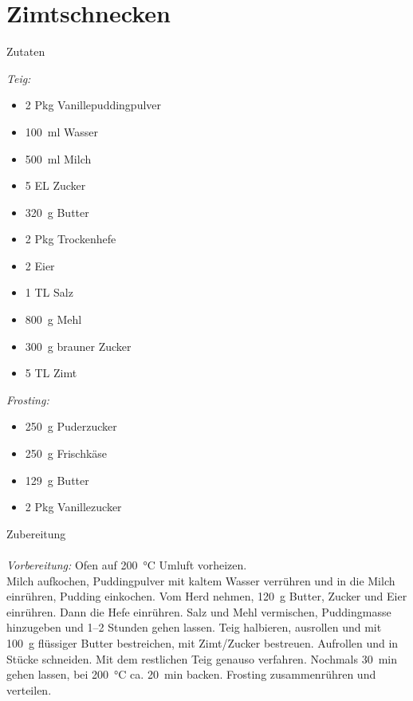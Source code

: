 \section*{Zimtschnecken}
\ihead{}\ohead{}
\cfoot{}
{\Large Zutaten}
\begin{multicols}{2}
\textit{Teig:}
\begin{itemize}
    \item \num{2} Pkg Vanillepuddingpulver
    \item \SI{100}{ml} Wasser
    \item \SI{500}{ml} Milch
    \item \num{5} EL Zucker
    \item \SI{320}{g} Butter
    \item \num{2} Pkg Trockenhefe
    \item \num{2} Eier
    \item \num{1} TL Salz
    \item \SI{800}{g} Mehl
    \item \SI{300}{g} brauner Zucker
    \item \num{5} TL Zimt
\end{itemize}
\textit{Frosting:}
\begin{itemize}
    \item \SI{250}{g} Puderzucker
    \item \SI{250}{g} Frischkäse
    \item \SI{129}{g} Butter
    \item \num{2} Pkg Vanillezucker
\end{itemize}
\end{multicols}
\noindent
{\Large Zubereitung}\\
\\
\textit{Vorbereitung:} Ofen auf \SI{200}{\celsius} Umluft vorheizen.\\
Milch aufkochen, Puddingpulver mit kaltem Wasser verrühren und in die Milch einrühren, Pudding einkochen.
Vom Herd nehmen, \SI{120}{g} Butter, Zucker und Eier einrühren.
Dann die Hefe einrühren. 
Salz und Mehl vermischen, Puddingmasse hinzugeben und \numrange{1}{2} Stunden gehen lassen.
Teig halbieren, ausrollen und mit \SI{100}{g} flüssiger Butter bestreichen, mit Zimt/Zucker bestreuen. 
Aufrollen und in Stücke schneiden.
Mit dem restlichen Teig genauso verfahren. 
Nochmals \SI{30}{min} gehen lassen, bei \SI{200}{\celsius} ca. \SI{20}{min} backen.
Frosting zusammenrühren und verteilen. 
